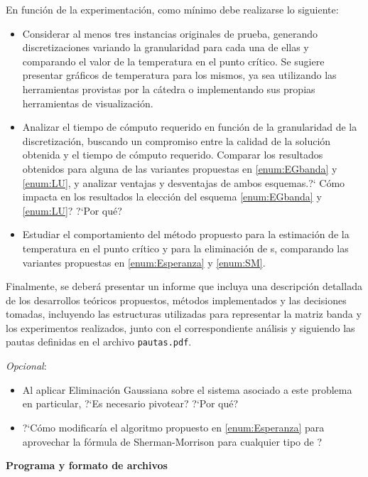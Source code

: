 En funci\'on de la experimentaci\'on, como m\'inimo debe realizarse lo siguiente:
\begin{itemize}
\item Considerar al menos tres instancias originales de prueba, generando discretizaciones variando la granularidad para cada una de ellas y comparando el valor de la temperatura en el punto cr\'itico. Se sugiere presentar gr\'aficos de temperatura para los mismos, ya sea utilizando las herramientas provistas por la c\'atedra o implementando sus propias herramientas de visualizaci\'on.
\item Analizar el tiempo de c\'omputo requerido en funci\'on de la granularidad de la discretizaci\'on, buscando un 
compromiso entre la calidad de la soluci\'on obtenida y el tiempo de c\'omputo requerido. Comparar los resultados
obtenidos para alguna de las variantes propuestas en \ref{enum:EGbanda} y \ref{enum:LU}, y analizar ventajas 
y desventajas de ambos esquemas.?` C\'omo impacta en los resultados la elecci\'on del esquema \ref{enum:EGbanda} y \ref{enum:LU}? ?`Por qu\'e?
\item Estudiar el comportamiento del m\'etodo propuesto para la estimaci\'on de la temperatura en el punto cr\'itico y para la eliminaci\'on
de \atacante s, comparando las variantes propuestas en \ref{enum:Esperanza} y \ref{enum:SM}.
\end{itemize}

Finalmente, se deber\'a presentar un informe que incluya una descripci\'on detallada de los desarrollos te\'oricos propuestos, m\'etodos 
implementados y las decisiones tomadas, incluyendo las estructuras utilizadas para representar la matriz banda  y los experimentos
realizados, junto con el correspondiente an\'alisis y siguiendo las pautas definidas en el archivo \verb+pautas.pdf+.

 
\textit{Opcional}:
\vspace*{-0.3cm}
\begin{itemize}
	\item Al aplicar Eliminaci\'on Gaussiana sobre el sistema asociado a este problema en particular, ?`Es necesario pivotear? ?`Por qu\'e?
	\item ?`C\'omo modificar\'ia el algoritmo propuesto en \ref{enum:Esperanza} para aprovechar la f\'ormula de Sherman-Morrison \cite{ShermanMorrison} para cualquier tipo de \atacante ?
\end{itemize}

{\noindent \bf Programa y formato de archivos}

